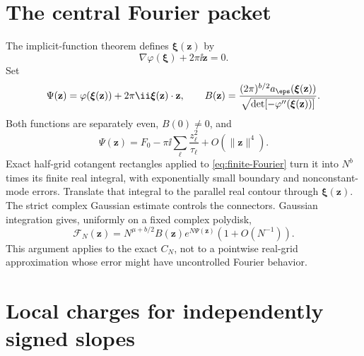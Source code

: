 \section{The central Fourier packet}
The implicit-function theorem defines $\boldsymbol\xi(\mathbf z)$ by
\[
 \nabla\varphi(\boldsymbol\xi)+2\pi\ii\mathbf z=0.
\]
Set
\begin{equation}\label{eq:Fourier-action}
 \Psi(\mathbf z)=\varphi(\boldsymbol\xi(\mathbf z))
      +2\pi\ii\boldsymbol\xi(\mathbf z)\cdot\mathbf z,
 \qquad
 B(\mathbf z)=\frac{(2\pi)^{b/2}a_\eps(\boldsymbol\xi(\mathbf z))}
 {\sqrt{\det[-\varphi''(\boldsymbol\xi(\mathbf z))]}}.
\end{equation}
Both functions are separately even, $B(0)\ne0$, and
\begin{equation}\label{eq:Psi-quadratic}
 \Psi(\mathbf z)=F_0-\pi\ii\sum_\ell\frac{z_\ell^2}{\tau_\ell}
 +O(\|\mathbf z\|^4).
\end{equation}
Exact half-grid cotangent rectangles applied to \eqref{eq:finite-Fourier} turn it into $N^b$ times its finite real integral, with exponentially small boundary and nonconstant-mode errors. Translate that integral to the parallel real contour through $\boldsymbol\xi(\mathbf z)$. The strict complex Gaussian estimate controls the connectors. Gaussian integration gives, uniformly on a fixed complex polydisk,
\begin{equation}\label{eq:Fourier-packet}
 \mathcal F_N(\mathbf z)=N^{\mu+b/2}B(\mathbf z)e^{N\Psi(\mathbf z)}
 (1+O(N^{-1})).
\end{equation}
This argument applies to the exact $C_N$, not to a pointwise real-grid approximation whose error might have uncontrolled Fourier behavior.

\section{Local charges for independently signed slopes}

